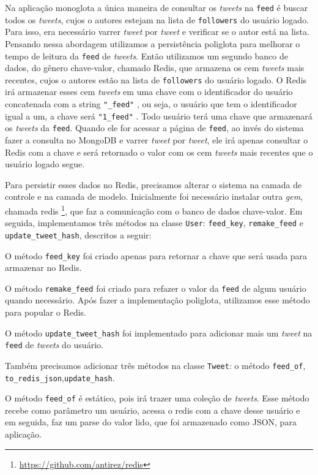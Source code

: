 Na aplicação monoglota a única maneira de consultar os \textit{tweets} na \verb|feed| é buscar todos os \textit{tweets}, cujos o autores estejam na lista de \verb|followers| do usuário logado. Para isso, era necessário varrer \textit{tweet} por \textit{tweet} e verificar se o autor está na lista. Pensando nessa abordagem utilizamos a persistência poliglota para melhorar o tempo de leitura da \verb|feed| de \textit{tweets}.
Então utilizamos um segundo banco de dados, do gênero chave-valor, chamado \ac{Redis}, que armazena os cem \textit{tweets} mais recentes, cujos o autores estão na lista de \verb|followers| do usuário logado.
O \ac{Redis} irá armazenar esses cem \textit{tweets} em uma chave com o identificador do usuário concatenada com a string \verb|"_feed"| , ou seja, o usuário que tem o identificador igual a um, a chave será \verb|"1_feed"| . Todo usuário terá uma chave que armazenará os \textit{tweets} da \verb|feed|. Quando ele for acessar a página de \verb|feed|, ao invés do sistema fazer a consulta no MongoDB e varrer \textit{tweet} por \textit{tweet}, ele irá apenas consultar o \ac{Redis} com a chave e será retornado o valor com os cem \textit{tweets} mais recentes que o usuário logado segue.


Para persistir esses dados no \ac{Redis}, precisamos alterar o sistema na camada de controle e na camada de modelo. Inicialmente foi necessário instalar outra \textit{gem}, chamada redis \footnote{\url{https://github.com/antirez/redis}}, que faz a comunicação com o banco de dados chave-valor. Em seguida, implementamos três métodos na classe \verb|User|: \verb|feed_key|, \verb|remake_feed| e \verb|update_tweet_hash|, descritos a seguir:

O método \verb|feed_key| foi criado apenas para retornar a chave que será usada para armazenar no \ac{Redis}.

O método \verb|remake_feed| foi criado para refazer o valor da \verb|feed| de algum usuário quando necessário. Após fazer a implementação poliglota, utilizamos esse método para popular o \ac{Redis}.

O método \verb|update_tweet_hash| foi implementado para adicionar mais um \textit{tweet} na \verb|feed| de \textit{tweets} do usuário.

Também precisamos adicionar três métodos na classe \verb|Tweet|: o método \verb|feed_of|, \verb|to_redis_json|,\verb|update_hash|.

O método \verb|feed_of| é estático, pois irá trazer uma coleção de \textit{tweets}. Esse método recebe como parâmetro um usuário, acessa o redis com a chave desse usuário e em seguida, faz um parse do valor lido, que foi armazenado como JSON, para aplicação.

